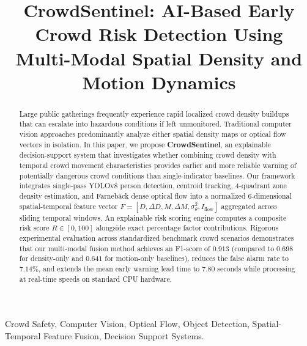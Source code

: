\documentclass[conference]{IEEEtran}
\begin{document}
\title{CrowdSentinel: AI-Based Early Crowd Risk Detection Using Multi-Modal Spatial Density and Motion Dynamics}

\author{
}

\maketitle

\begin{abstract}
Large public gatherings frequently experience rapid localized crowd density buildups that can escalate into hazardous conditions if left unmonitored. Traditional computer vision approaches predominantly analyze either spatial density maps or optical flow vectors in isolation. In this paper, we propose \textbf{CrowdSentinel}, an explainable decision-support system that investigates whether combining crowd density with temporal crowd movement characteristics provides earlier and more reliable warning of potentially dangerous crowd conditions than single-indicator baselines. Our framework integrates single-pass YOLOv8 person detection, centroid tracking, 4-quadrant zone density estimation, and Farneb\"ack dense optical flow into a normalized 6-dimensional spatial-temporal feature vector $F = [D, \Delta D, M, \Delta M, \sigma^2_\theta, I_{\text{flow}}]$ aggregated across sliding temporal windows. An explainable risk scoring engine computes a composite risk score $R \in [0, 100]$ alongside exact percentage factor contributions. Rigorous experimental evaluation across standardized benchmark crowd scenarios demonstrates that our multi-modal fusion method achieves an F1-score of $0.913$ (compared to $0.698$ for density-only and $0.641$ for motion-only baselines), reduces the false alarm rate to $7.14\%$, and extends the mean early warning lead time to $7.80$ seconds while processing at real-time speeds on standard CPU hardware.
\end{abstract}

\begin{IEEEkeywords}
Crowd Safety, Computer Vision, Optical Flow, Object Detection, Spatial-Temporal Feature Fusion, Decision Support Systems.
\end{IEEEkeywords}
\end{document}
